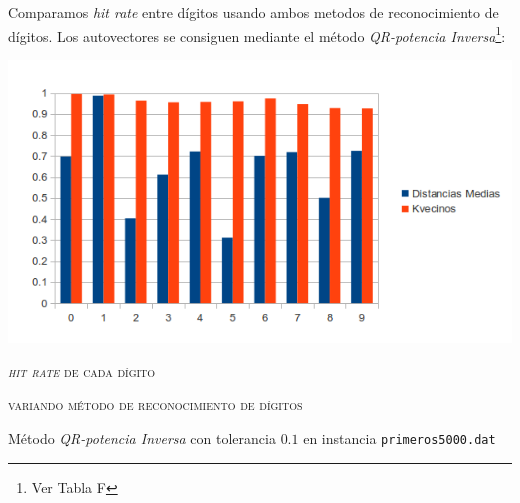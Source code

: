 		Comparamos \textit{hit rate} entre d\'igitos usando ambos metodos de reconocimiento
		de d\'igitos. Los autovectores se consiguen mediante el m\'etodo
		\textit{QR-potencia Inversa}\footnote{Ver Tabla F}:

		\vspace{5mm}
		\centerline{\includegraphics[width=14cm]{img/bam.png}}
		\centerline{\textsc{\textit{hit rate} de cada d\'igito}}
		\centerline{\textsc{variando m\'etodo de reconocimiento de d\'igitos}}
		\centerline{M\'etodo \textit{QR-potencia Inversa} con tolerancia $0.1$ en
		instancia \texttt{primeros5000.dat}}
		\vspace{5mm}
